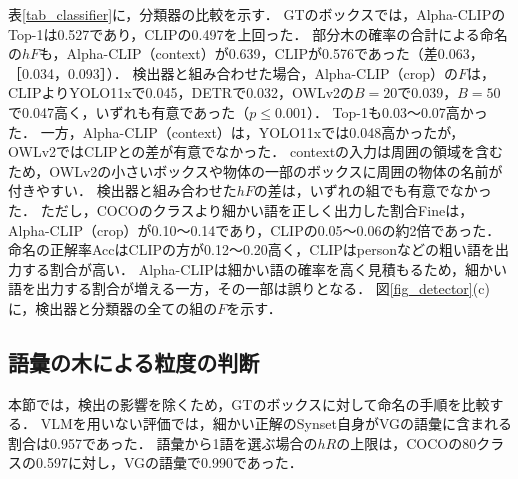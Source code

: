 表\ref{tab_classifier}に，分類器の比較を示す．
GTのボックスでは，Alpha-CLIPのTop-1は0.527であり，CLIPの0.497を上回った．
部分木の確率の合計による命名の$ hF $も，Alpha-CLIP（context）が0.639，CLIPが0.576であった（差0.063，［0.034，0.093］）．
検出器と組み合わせた場合，Alpha-CLIP（crop）の$ F $は，CLIPよりYOLO11xで0.045，DETRで0.032，OWLv2の$ B = 20 $で0.039，$ B = 50 $で0.047高く，いずれも有意であった（$ p \leq 0.001 $）．
Top-1も0.03〜0.07高かった．
一方，Alpha-CLIP（context）は，YOLO11xでは0.048高かったが，OWLv2ではCLIPとの差が有意でなかった．
contextの入力は周囲の領域を含むため，OWLv2の小さいボックスや物体の一部のボックスに周囲の物体の名前が付きやすい．
検出器と組み合わせた$ hF $の差は，いずれの組でも有意でなかった．
ただし，COCOのクラスより細かい語を正しく出力した割合Fineは，Alpha-CLIP（crop）が0.10〜0.14であり，CLIPの0.05〜0.06の約2倍であった．
命名の正解率AccはCLIPの方が0.12〜0.20高く，CLIPはpersonなどの粗い語を出力する割合が高い．
Alpha-CLIPは細かい語の確率を高く見積もるため，細かい語を出力する割合が増える一方，その一部は誤りとなる．
図\ref{fig_detector}(c)に，検出器と分類器の全ての組の$ F $を示す．

\subsection{語彙の木による粒度の判断}
本節では，検出の影響を除くため，GTのボックスに対して命名の手順を比較する．
VLMを用いない評価では，細かい正解のSynset自身がVGの語彙に含まれる割合は0.957であった．
語彙から1語を選ぶ場合の$ hR $の上限は，COCOの80クラスの0.597に対し，VGの語彙で0.990であった．

\begin{table}[t]
\centering
\caption{GTのボックスに対する命名の手順の比較（テスト用の画像）．$ hF $：細かい粒度の階層的F値，Acc：命名の正解率，Fine：正しくCOCOのクラスより細かい語を出力した割合．}
\label{tab_naming}
\setlength{\tabcolsep}{3pt}
\end{table}

